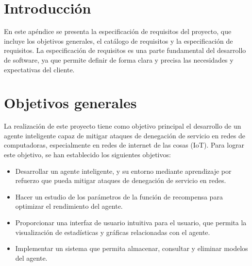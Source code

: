 
\section{Introducción}

En este apéndice se presenta la especificación de requisitos del proyecto, que incluye los objetivos generales, el catálogo de requisitos y la especificación de requisitos. La especificación de requisitos es una parte fundamental del desarrollo de software, ya que permite definir de forma clara y precisa las necesidades y expectativas del cliente.


\section{Objetivos generales}
La realización de este proyecto tiene como objetivo principal el desarrollo de un agente inteligente capaz de mitigar ataques de denegación de servicio en redes de computadoras, especialmente en redes de internet de las cosas (IoT). 
Para lograr este objetivo, se han establecido los siguientes objetivos:
\begin{itemize}
	\item Desarrollar un agente inteligente, y su entorno mediante aprendizaje por refuerzo que pueda mitigar ataques de denegación de servicio en redes.
	\item Hacer un estudio de los parámetros de la función de recompensa para optimizar el rendimiento del agente.
	\item Proporcionar una interfaz de usuario intuitiva para el usuario, que permita la visualización de estadísticas y gráficas relacionadas con el agente.
	\item Implementar un sistema que permita almacenar, consultar y eliminar modelos del agente.
\end{itemize}


